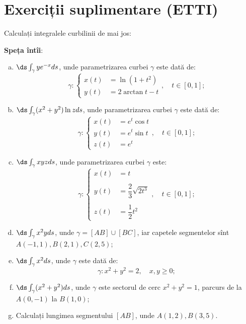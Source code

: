 \section{Exerciții suplimentare (ETTI)}

Calculați integralele curbilinii de mai jos:

\textbf{Speța întîi}:
\begin{enumerate}[(a)]
\item $ \ds\int_\gamma ye^{-x} ds $, unde parametrizarea curbei $ \gamma $
  este dată de:
  \[
    \gamma : %
    \begin{cases}
      x(t) &= \ln(1 + t^2) \\
      y(t) &= 2 \arctan t - t
    \end{cases}, \quad t \in [0, 1];
  \]
\item $ \ds\int_\gamma (x^2 + y^2) \ln z ds $, unde parametrizarea curbei
  $ \gamma $ este dată de:
  \[
    \gamma : %
    \begin{cases}
      x(t) &= e^t \cos t \\
      y(t) &= e^t \sin t \\
      z(t) &= e^t
    \end{cases}, \quad t \in [0, 1];
  \]
\item $ \ds\int_\gamma xyz ds $, unde parametrizarea curbei $ \gamma $ este:
  \[
    \gamma : %
    \begin{cases}
      x(t) &= t \\
      & \\
      y(t) &= \dfrac{2}{3}\sqrt{2t^3} \\
      & \\
      z(t) &= \dfrac{1}{2} t^2
    \end{cases}, \quad t \in [0, 1];
  \]
\item $ \ds\int_\gamma x^2y ds $, unde $ \gamma = [AB] \cup [BC] $,
  iar capetele segmentelor sînt $ A(-1, 1), B(2, 1), C(2, 5) $;
\item $ \ds\int_\gamma x^2 ds $, unde $ \gamma $ este dată de:
  \[
    \gamma : x^2 + y^2 = 2, \quad x, y \geq 0;
  \]
\item $ \ds\int_\gamma (x^2 + y^2) ds $, unde $ \gamma $ este sectorul
  de cerc $ x^2 + y^2 = 1 $, parcurs de la $ A(0, -1) $ la $ B(1, 0) $;
\item Calculați lungimea segmentului $ [AB] $, unde $ A(1, 2), B(3, 5) $.
\end{enumerate}


